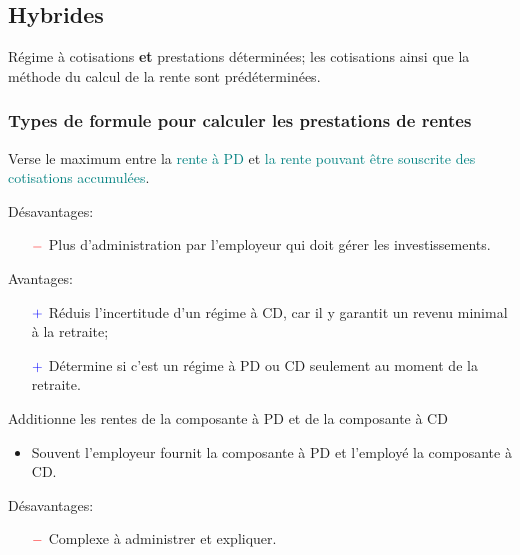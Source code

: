\documentclass[10pt, french]{article}
\begin{document}
\begin{multicols*}{3}
\newpage

\subsection{Hybrides}

\begin{definitionNOHFILL}[Description]
Régime à cotisations \textbf{et} prestations déterminées; les cotisations ainsi que la méthode du calcul de la rente sont prédéterminées.
\end{definitionNOHFILL}

\subsubsection*{Types de formule pour calculer les prestations de rentes}

\begin{definitionNOHFILL}
Verse le maximum entre la \textcolor{teal}{rente à PD} et \textcolor{teal}{la rente pouvant être souscrite des cotisations accumulées}.


Désavantages:
\begin{itemize}
	\item[$\color{red}-$]	Plus d'administration par l'employeur qui doit gérer les investissements.
\end{itemize} 

Avantages:
\begin{itemize}
	\item[$\color{blue}+$]	Réduis l'incertitude d'un régime à CD, car il y garantit un revenu minimal à la retraite;
	\item[$\color{blue}+$]	Détermine si c'est un régime à PD ou CD seulement au moment de la retraite.
\end{itemize}
\end{definitionNOHFILL}

\begin{definitionNOHFILL}[Combiné]
Additionne les rentes de la composante à PD et de la composante à CD

\begin{itemize}[leftmargin = *]
	\item	Souvent l'employeur fournit la composante à PD et l'employé la composante à CD.
\end{itemize}

Désavantages:
\begin{itemize}
	\item[$\color{red}-$]	Complexe à administrer et expliquer.
\end{itemize}
\end{definitionNOHFILL}



\end{multicols*}
\end{document}

